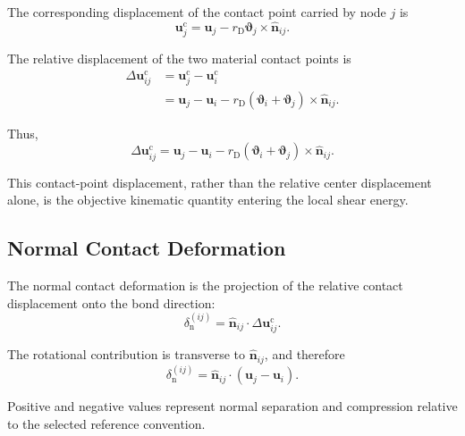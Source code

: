 The corresponding displacement of the contact point carried by node $j$ is
\begin{equation}
    \mathbf{u}_j^{\mathrm{c}} = \mathbf{u}_j - r_{\mathrm{D}} \boldsymbol{\vartheta}_j \times \hat{\mathbf{n}}_{ij}.
\end{equation}

The relative displacement of the two material contact points is
\begin{equation}
\begin{aligned}
    \Delta\mathbf{u}_{ij}^{\mathrm{c}} &= \mathbf{u}_j^{\mathrm{c}} - \mathbf{u}_i^{\mathrm{c}} \\[3pt]
    &= \mathbf{u}_j - \mathbf{u}_i - r_{\mathrm{D}} \left( \boldsymbol{\vartheta}_i + \boldsymbol{\vartheta}_j \right) \times \hat{\mathbf{n}}_{ij}.
\end{aligned}
\end{equation}

Thus,
\begin{equation}
    \boxed{ \Delta\mathbf{u}_{ij}^{\mathrm{c}} = \mathbf{u}_j - \mathbf{u}_i - r_{\mathrm{D}} \left( \boldsymbol{\vartheta}_i + \boldsymbol{\vartheta}_j \right) \times \hat{\mathbf{n}}_{ij} }.
\end{equation}

This contact-point displacement, rather than the relative center displacement alone, is the objective kinematic quantity entering the local shear energy.

\subsection{Normal Contact Deformation}

The normal contact deformation is the projection of the relative contact displacement onto the bond direction:
\begin{equation}
    \delta_{\mathrm{n}}^{(ij)} = \hat{\mathbf{n}}_{ij} \cdot \Delta\mathbf{u}_{ij}^{\mathrm{c}}.
\end{equation}

The rotational contribution is transverse to $\hat{\mathbf{n}}_{ij}$, and therefore
\begin{equation}
    \boxed{ \delta_{\mathrm{n}}^{(ij)} = \hat{\mathbf{n}}_{ij} \cdot \left( \mathbf{u}_j - \mathbf{u}_i \right) }.
\end{equation}

Positive and negative values represent normal separation and compression relative to the selected reference convention.

